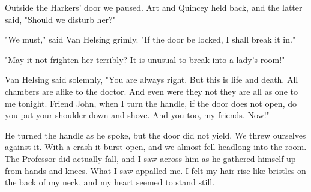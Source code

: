 Outside the Harkers' door we paused. Art and Quincey held back, and the latter said, "Should we disturb her?" 

"We must," said Van Helsing grimly. "If the door be locked, I shall break it in." 

"May it not frighten her terribly? It is unusual to break into a lady's room!" 

Van Helsing said solemnly, "You are always right. But this is life and death. All chambers are alike to the doctor. And even were they not they are all as one to me tonight. Friend John, when I turn the handle, if the door does not open, do you put your shoulder down and shove. And you too, my friends. Now!" 

He turned the handle as he spoke, but the door did not yield. We threw ourselves against it. With a crash it burst open, and we almost fell headlong into the room. The Professor did actually fall, and I saw across him as he gathered himself up from hands and knees. What I saw appalled me. I felt my hair rise like bristles on the back of my neck, and my heart seemed to stand still. 

